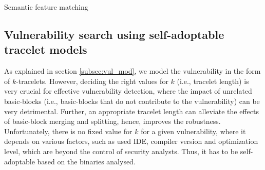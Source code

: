 \begin{algorithm}[t]                  
\footnotesize
\caption{Semantic feature matching }          
\label{alg:sem_fea_mat}   
\begin{spacing}{1.2}          
  \setcounter{AlgoLine}{0}
\end{spacing}
\end{algorithm}


\subsection{Vulnerability search using self-adoptable tracelet models} \label{subsec:nns}
As explained in section \ref{subsec:vul_mod}, we model the vulnerability in the form of $k$-tracelets. However, deciding the right values for  $k$ (i.e., tracelet length) is very crucial for effective vulnerability detection, where the impact of unrelated basic-blocks (i.e., basic-blocks that do not contribute to the vulnerability) can be very detrimental. Further, an appropriate tracelet length can alleviate the effects of basic-block merging and splitting, hence, improves the robustness. Unfortunately, there is no fixed value for $k$ for a given vulnerability, where it depends on various factors, such as used IDE, compiler version and optimization level, which are beyond the control of security analysts. Thus, it has to be self-adoptable based on the binaries analysed.

